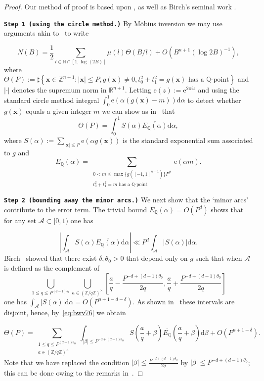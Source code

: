 \documentclass[a4paper,12pt,reqno]{amsart}
\numberwithin{equation}{section} \numberwithin{figure}{section}
\newcommand\Z{\mathbb{Z}}
\newcommand\N{\mathbb{N}}
\newcommand\Q{\mathbb{Q}}
\newcommand\R{\mathbb{R}}
\renewcommand{\b}{\mathbf}
\renewcommand{\c}{\mathcal}
\renewcommand{\leq}{\leqslant}
\renewcommand{\#}{\sharp}
\theoremstyle{definition}
\numberwithin{lemma}{section}
\newcommand{\beq}[2]
{
\begin{equation}
\label{#1}
{#2}
\end{equation}
}
\begin{document}
\begin{proof}
Our method of proof is based upon \cite{MR4353917}, as well as Birch's seminal work \cite{Bir62}.

\textbf{ \texttt{Step 1 (using the circle method.)}}
By M\"obius inversion we may use arguments akin
to~\cite[Lemma 2.1]{MR4353917} to write 
 \beq{eq:vislem2.1}{N(B)=\frac{1}{2} \sum_{l\in \N \cap[1, \log(2B) ] } \mu(l) \Theta(B/l)+O(B^{n+1}(\log 2B)^{-1} ),}where 
 $ \Theta(P):=\#\left\{\b x\in \Z^{n+1} : |\b x |\leq P,g(\b x)\neq 0 , t_0^2+t_1^2=g( \b x ) \text{ has a } \Q\text{-point}  \right\}$
and $|\cdot |$ denotes the supremum norm in $\R^{n+1}$.
Letting $\mathrm e(z):= \mathrm e^{2 \pi i z }$ and using the standard circle method integral 
$\int_0^1 \mathrm e(\alpha (g(\b x ) - m )) \mathrm d \alpha $ to detect whether $g(\b x )$   equals 
 a given integer $m $ we can show as in~\cite[Equation (2.2)]{MR4353917} 
that   $$ \Theta(P)= \int_0^1 S(\alpha) \overline{E_\Q(\alpha)}\mathrm d \alpha ,$$ where 
$ S(\alpha):=\sum_{|\b x|\leq P }\mathrm e (\alpha g(\b x )) $ is the standard exponential sum associated to $g$
and $$E_\Q(\alpha)=\sum_{\substack{ 0< m \leq  \max\{g([-1,1]^{n+1} )\} P^d  \\ 
 t_0^2+t_1^2=m \text{ has a } \Q\text{-point}    } } \mathrm e(\alpha m ).$$

\textbf{\texttt{Step 2 (bounding away the minor arcs.)}}
We next show that the `minor arcs' contribute to the error term.
The trivial bound $E_\Q(\alpha)=O(P^d )$ shows that for any set $\mathcal A \subset [0,1)$ one has 
\beq{eq:bwv76}{ \left| \int_{\mathcal A } S(\alpha) \overline{E_\Q(\alpha)}\mathrm d \alpha \right|
\ll P^d  \int_{\mathcal A } \left|S(\alpha) \right|\mathrm d \alpha.} Birch~\cite[Equations (10)-(11), Lemma 4.3]{Bir62} showed 
that there exist $\delta, \theta_0>0 $ that depend
only on $g $ such that when $\c A$ is defined as the complement of 
$$ \bigcup_{1\leq q \leq P^{(d-1)\theta_0}} 
 \bigcup_{a\in (\Z/q\Z)^\times  } \left[\frac{a}{q}-\frac{ P^{-d+(d-1)\theta_0}}{2q} ,\frac{a}{q}+\frac{ P^{-d+(d-1)\theta_0}}{2q} \right]
$$ one has $  \int_{\mathcal A } |S(\alpha) |\mathrm d \alpha=O(P^{n+1-d-\delta})$.
As shown in~\cite[Lemma 4.1]{Bir62}
these intervals are disjoint, hence, by~\eqref{eq:bwv76} we obtain 
\beq{eq:birhtheta_1}{ \Theta(P)= \sum_{\substack{ 1\leq  q \leq P^{(d-1)\theta_0}\\
 a\in (\Z/q\Z)^\times   }} 
  \int_{|\beta|\leq P^{-d+(d-1)\theta_0}} S\left(\frac{a}{q}+\beta\right) \overline{E_\Q}\left(\frac{a}{q}+\beta\right)
\mathrm d \beta 
+O(P^{n+1-\delta}) .} Note that we have replaced the condition 
$|\beta| \leq  \frac{ P^{-d+(d-1)\theta_0}}{2q}$ by 
$ |\beta | \leq  P^{-d+(d-1)\theta_0}$; this can be done owing to the remarks in~\cite[page 253]{Bir62}.



\end{proof}
\end{document}
